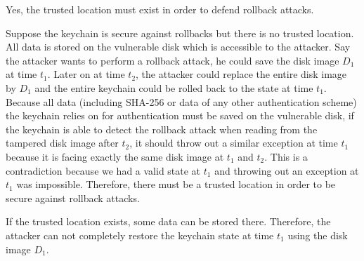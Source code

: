 \documentclass[12pt]{article}
\newenvironment{question}[2][Question]{\begin{trivlist}
\item[\hskip \labelsep {\bfseries #1}\hskip \labelsep {\bfseries #2.}]}{\end{trivlist}}
\begin{document}
\begin{question}{3} 
Yes, the trusted location must exist in order to defend rollback attacks. 

Suppose the keychain is secure against rollbacks but there is no trusted location. All data is stored on the vulnerable disk which is accessible to the attacker. Say the attacker wants to perform a rollback attack, he could save the disk image $D_1$ at time $t_1$. Later on at time $t_2$, the attacker could replace the entire disk image by $D_1$ and the entire keychain could be rolled back to the state at time $t_1$. Because all data (including SHA-256 or data of any other authentication scheme) the keychain relies on for authentication must be saved on the vulnerable disk, if the keychain is able to detect the rollback attack when reading from the tampered disk image after $t_2$, it should throw out a similar exception at time $t_1$ because it is facing exactly the same disk image at $t_1$ and $t_2$. This is a contradiction because we had a valid state at $t_1$ and throwing out an exception at $t_1$ was impossible. Therefore, there must be a trusted location in order to be secure against rollback attacks.

If the trusted location exists, some data can be stored there. Therefore, the attacker can not completely restore the keychain state at time $t_1$ using the disk image $D_1$.

\end{question}
\end{document}
